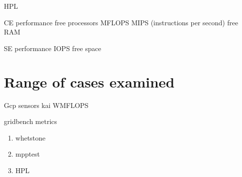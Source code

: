 HPL
\cite{gridbench}

CE performance
free processors
MFLOPS
MIPS (instructions per second)
free RAM

SE performance
IOPS
free space

\section{Range of cases examined}
Gcp sensors kai WMFLOPS
\cite{gcpsensor}

gridbench metrics
\begin{enumerate}
  \item whetstone
  \item mpptest
  \item HPL
\end{enumerate}
\cite{gridbench} 